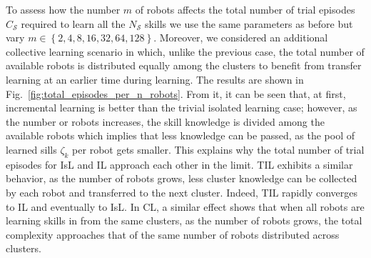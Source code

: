 To assess how the number $m$ of robots affects the total number of trial episodes $C_\mathcal{S}$ required to learn all the $N_\mathcal{S}$ skills we use the same parameters as before but vary $m \in \left \lbrace 2,4,8,16,32,64,128\right \rbrace$. Moreover, we considered an additional collective learning scenario in which, unlike the previous case, the total number of available robots is distributed equally among the clusters to benefit from transfer learning at an earlier time during learning. The results are shown in Fig.~\ref{fig:total_episodes_per_n_robots}. From it, it can be seen that, at first, incremental learning is better than the trivial isolated learning case; however, as the number or robots increases, the skill knowledge is divided among the available robots which implies that less knowledge can be passed, as the pool of learned sills $\zeta_k$ per robot gets smaller. This explains why the total number of trial episodes for IsL and IL approach each other in the limit. TIL exhibits a similar behavior, as the number of robots grows, less cluster knowledge can be collected by each robot and transferred to the next cluster. Indeed, TIL rapidly converges to IL and eventually to IsL. In CL, a similar effect shows that when all robots are learning skills in from the same clusters, as the number of robots grows, the total complexity approaches that of the same number of robots distributed across clusters.

